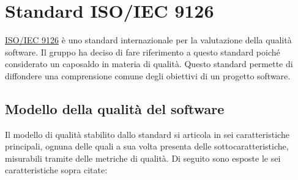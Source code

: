\section{Standard ISO/IEC 9126} \label{section:ISO_IEC_9126}
\href{http://www.colonese.it/00-Manuali_Pubblicatii/07-ISO-IEC9126_v2.pdf}{ISO/IEC 9126} è uno standard internazionale per la valutazione della qualità software.
Il gruppo \groupName{} ha deciso di fare riferimento a questo standard poiché considerato un caposaldo in materia di qualità.
Questo standard permette di diffondere una comprensione comune degli obiettivi di un progetto software.

\subsection{Modello della qualità del software} \label{subsection:modello_qualitaSW}
Il modello di qualità stabilito dallo standard si articola in sei caratteristiche principali, ognuna delle quali a sua volta presenta delle sottocaratteristiche, misurabili tramite delle metriche di qualità.
Di seguito sono esposte le sei caratteristiche sopra citate:
